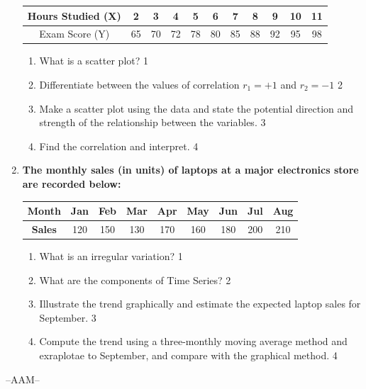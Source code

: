\documentclass[12pt]{article}
\begin{document}
\begin{enumerate}
\begin{table}[h!]
\centering
\begin{tabular}{c|c|c|c|c|c|c|c|c|c|c}
Hours Studied (X) & 2 & 3 & 4 & 5 & 6 & 7 & 8 & 9 & 10 & 11 \\ \hline
Exam Score (Y) & 65 & 70 & 72 & 78 & 80 & 85 & 88 & 92 & 95 & 98 \\
\end{tabular}
\end{table}

  \begin{enumerate}
    \item What is a scatter plot? \hfill 1
  \item Differentiate between the values of correlation $r_1 = +1$ and $r_2=-1$ \hfill 2
    \item  
	Make a scatter plot using the data and state the potential direction and strength of the relationship between the variables. \hfill 3
    \item
	Find the correlation and interpret. \hfill 4
  \end{enumerate}

  \item
\textbf{The monthly sales (in units) of laptops at a major electronics store are recorded below:} 

\begin{table}[h]
\centering
\begin{tabular}{c|cccccccc}
\textbf{Month} & Jan & Feb & Mar & Apr & May & Jun & Jul & Aug \\ \hline
\textbf{Sales} & 120 & 150 & 130 & 170 & 160 & 180 & 200 & 210
\end{tabular}
\end{table}

\begin{enumerate}
  \item What is an irregular variation? \hfill 1
   \item What are the components of Time Series?   \hfill 2
  \item
  Illustrate the trend graphically and estimate the expected laptop sales for September. \hfill 3
  \item  
  Compute the trend using a three-monthly moving average method and exraplotae to September, and compare with the graphical method. \hfill 4

\end{enumerate}

\end{enumerate}
 \vspace{2.5cm}

\begin{center}

  \vfill
  --AAM--
\end{center}
\end{document}
